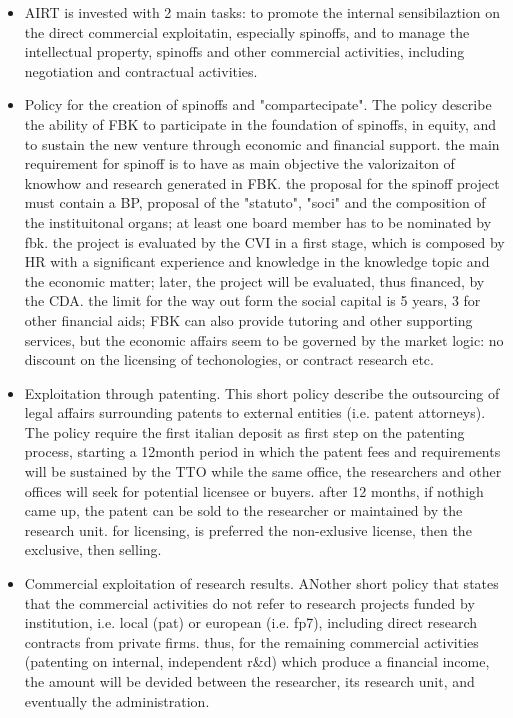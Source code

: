 \begin{itemize}

\item AIRT is invested with 2 main tasks: to promote the internal sensibilaztion on the direct commercial exploitatin, especially spinoffs, and to manage the intellectual property, spinoffs and other commercial activities, including negotiation and contractual activities. 

\item Policy for the creation of spinoffs and "compartecipate". The policy describe the ability of FBK to participate in the foundation of spinoffs, in equity, and to sustain the new venture through economic and financial support. the main requirement for spinoff is to have as main objective the valorizaiton of knowhow and research generated in FBK. the proposal for the spinoff project must contain a BP, proposal of the "statuto", "soci" and the composition of the instituitonal organs; at least one board member has to be nominated by fbk. the project is evaluated by the CVI in a first stage, which is composed by HR with a significant experience and knowledge in the knowledge topic and the economic matter; later, the project will be evaluated, thus financed, by the CDA. the limit for the way out form the social capital is 5 years, 3 for other financial aids; FBK can also provide tutoring and other supporting services, but the economic affairs seem to be governed by the market logic: no discount on the licensing of techonologies, or contract research etc. 

\item Exploitation through patenting. This short policy describe the outsourcing of legal affairs surrounding patents to external entities (i.e. patent attorneys). The policy require the first italian deposit as first step on the patenting process, starting a 12month period in which the patent fees and requirements will be sustained by the TTO while the same office, the researchers and other offices will seek for potential licensee or buyers. after 12 months, if nothigh came up, the patent can be sold to the researcher or maintained by the research unit. for licensing, is preferred the non-exlusive license, then the exclusive, then selling.

\item Commercial exploitation of research results. ANother short policy that states that the commercial activities do not refer to research projects funded by institution, i.e. local (pat) or european (i.e. fp7), including  direct research contracts from private firms. thus, for the remaining commercial activities (patenting on internal, independent r\&d) which produce a financial income, the amount will be devided between the researcher, its research unit, and eventually the administration.


\end{itemize}
